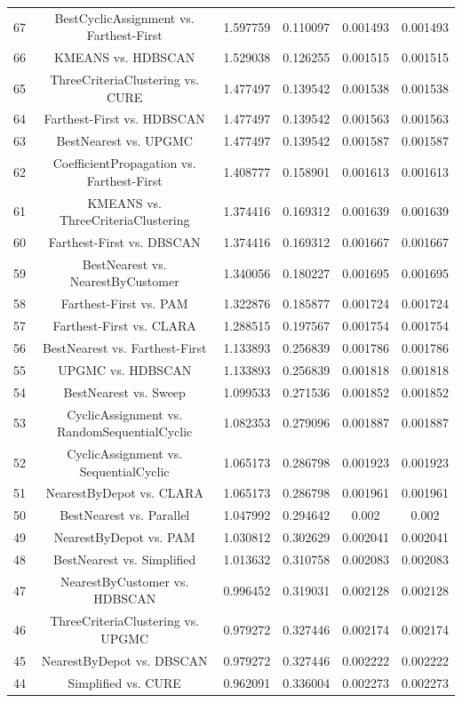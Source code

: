 \documentclass[a4paper,10pt]{article}
\begin{document}
\begin{landscape}
\begin{table}[!htp]
\begin{tabular}{cccccc}
67&BestCyclicAssignment vs. Farthest-First&1.597759&0.110097&0.001493&0.001493\\
66&KMEANS vs. HDBSCAN&1.529038&0.126255&0.001515&0.001515\\
65&ThreeCriteriaClustering vs. CURE&1.477497&0.139542&0.001538&0.001538\\
64&Farthest-First vs. HDBSCAN&1.477497&0.139542&0.001563&0.001563\\
63&BestNearest vs. UPGMC&1.477497&0.139542&0.001587&0.001587\\
62&CoefficientPropagation vs. Farthest-First&1.408777&0.158901&0.001613&0.001613\\
61&KMEANS vs. ThreeCriteriaClustering&1.374416&0.169312&0.001639&0.001639\\
60&Farthest-First vs. DBSCAN&1.374416&0.169312&0.001667&0.001667\\
59&BestNearest vs. NearestByCustomer&1.340056&0.180227&0.001695&0.001695\\
58&Farthest-First vs. PAM&1.322876&0.185877&0.001724&0.001724\\
57&Farthest-First vs. CLARA&1.288515&0.197567&0.001754&0.001754\\
56&BestNearest vs. Farthest-First&1.133893&0.256839&0.001786&0.001786\\
55&UPGMC vs. HDBSCAN&1.133893&0.256839&0.001818&0.001818\\
54&BestNearest vs. Sweep&1.099533&0.271536&0.001852&0.001852\\
53&CyclicAssignment vs. RandomSequentialCyclic&1.082353&0.279096&0.001887&0.001887\\
52&CyclicAssignment vs. SequentialCyclic&1.065173&0.286798&0.001923&0.001923\\
51&NearestByDepot vs. CLARA&1.065173&0.286798&0.001961&0.001961\\
50&BestNearest vs. Parallel&1.047992&0.294642&0.002&0.002\\
49&NearestByDepot vs. PAM&1.030812&0.302629&0.002041&0.002041\\
48&BestNearest vs. Simplified&1.013632&0.310758&0.002083&0.002083\\
47&NearestByCustomer vs. HDBSCAN&0.996452&0.319031&0.002128&0.002128\\
46&ThreeCriteriaClustering vs. UPGMC&0.979272&0.327446&0.002174&0.002174\\
45&NearestByDepot vs. DBSCAN&0.979272&0.327446&0.002222&0.002222\\
44&Simplified vs. CURE&0.962091&0.336004&0.002273&0.002273\\

\end{tabular}
\end{table}
\end{landscape}
\end{document}
